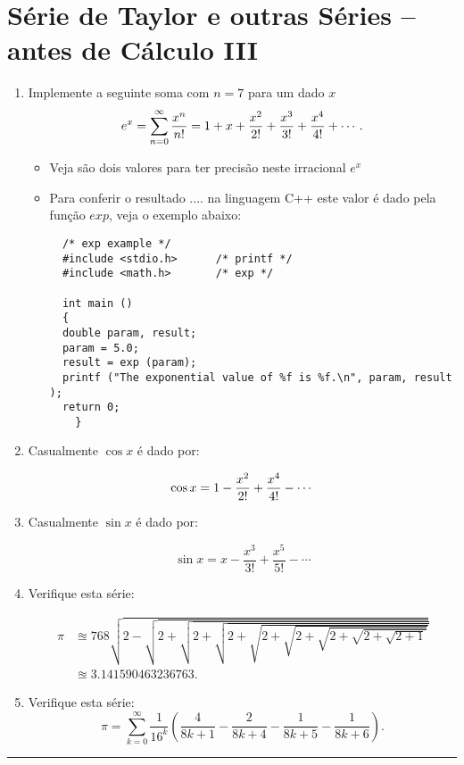 \documentclass[12pt,a4paper]{article}
\begin{document}
\begin{center}
\end{center}


\section{Série de Taylor e outras Séries -- antes de Cálculo III}
\begin{enumerate}
  \item Implemente a seguinte soma com  $n=7$ para um dado $x$
  $$e^x = \sum^\infty_{n=0} {x^n\over n!} =1 + x + {x^2 \over 2!} + {x^3 \over 3!} + {x^4 \over 4!}+\cdots.$$
  \begin{itemize}
    \item Veja são dois valores para ter precisão neste irracional $e^x$
    \item Para conferir o resultado .... na linguagem C++ este valor é dado pela função $exp$, veja o 
    exemplo abaixo:
       
\begin{verbatim}
  /* exp example */
  #include <stdio.h>      /* printf */
  #include <math.h>       /* exp */

  int main ()
  {
  double param, result;
  param = 5.0;
  result = exp (param);
  printf ("The exponential value of %f is %f.\n", param, result );
  return 0;
    }
\end{verbatim}
    
  \end{itemize}


\item Casualmente $\cos x$ é dado por:

$$\cos x = 1 - {x^2 \over 2!} + {x^4 \over 4!} - \cdots$$

\item Casualmente $\sin x$ é dado por:

$$\sin x =  x - \frac{x^3}{3!} + \frac{x^5}{5!} - \cdots $$


\item Verifique esta série:

\begin{align}
\pi &\approxeq 768 \sqrt{2 - \sqrt{2 + \sqrt{2 + \sqrt{2 + \sqrt{2 + \sqrt{2 + \sqrt{2 + \sqrt{2 + \sqrt{2+1}}}}}}}}}\\
&\approxeq 3.141590463236763.
\end{align}


\item Verifique esta série:
$$\pi = \sum_{k = 0}^\infty \frac{1}{16^k}
\left( \frac{4}{8k + 1} - \frac{2}{8k + 4} - \frac{1}{8k + 5} - \frac{1}{8k + 6}\right).$$

\end{enumerate}
\begin{center}
\rule{15cm}{0.1cm}
\end{center}
\end{document}
